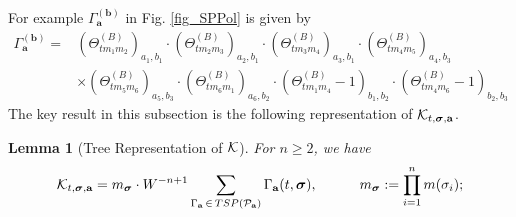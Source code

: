 \documentclass[10pt,reqno]{article}
\theoremstyle{plain} %
\newtheorem{lemma}[theorem]{Lemma}
\theoremstyle{remark}
\numberwithin{equation}{section}
\begin{document}
For example $\Gamma_{\textbf{a}}^{(\textbf{b})}$ in Fig. \ref{fig_SPPol} is given by 
\begin{align}   \nonumber
\Gamma_{\textbf{a}}^{(\textbf{b})}
=& (\Theta^{(B)}_{t m_1 m_2})_{a_1, b_1} \cdot (\Theta^{(B)}_{t m_2 m_3})_{a_2, b_1} \cdot (\Theta^{(B)}_{t m_3 m_4})_{a_3, b_1} \cdot (\Theta^{(B)}_{t m_4 m_5})_{a_4, b_3} \nonumber \\  \nonumber
& 
\times (\Theta^{(B)}_{t m_5 m_6})_{a_5, b_3} \cdot (\Theta^{(B)}_{t m_6 m_1})_{a_6, b_2}\cdot 
\left(\Theta^{(B)}_{t m_1 m_4} -1\right)_{b_1, b_2}
\cdot
\left(\Theta^{(B)}_{t m_4 m_6} -1\right)_{b_2, b_3} 
 \end{align}
The key result in this subsection is the following  representation of ${\cal K}_{t, \boldsymbol{\sigma}, \textbf{a}}$. %

\begin{lemma}[Tree Representation of $\cal K$]\label{Lemma_TRofK}
   For $n \ge 2$, we have
   \begin{equation}\label{eq_trcalK}
    {\cal K}_{t, \boldsymbol{\sigma}, \textbf{a}} =m_{\boldsymbol{\sigma}}\cdot W^{-n+1}\sum_{\Gamma_{\textbf{a}}\, \in\,  {TSP}({\cal P}_{\textbf{a}})} \Gamma_{ \textbf{a}}(t, \boldsymbol{\sigma}),\quad \quad \quad m_{\boldsymbol{\sigma}}:=\prod_{i=1}^n m(\sigma_i);
   \end{equation}  
\end{lemma}
\end{document}
